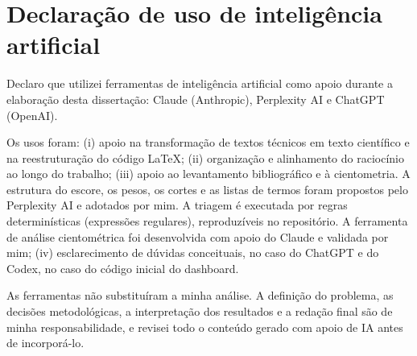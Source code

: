 
\chapter*{Declaração de uso de inteligência artificial}


Declaro que utilizei ferramentas de inteligência artificial como apoio durante a elaboração desta dissertação: Claude (Anthropic), Perplexity AI e ChatGPT (OpenAI).

Os usos foram: (i) apoio na transformação de textos técnicos em texto científico e na reestruturação do código LaTeX; (ii) organização e alinhamento do raciocínio ao longo do trabalho; (iii) apoio ao levantamento bibliográfico e à cientometria. A estrutura do escore, os pesos, os cortes e as listas de termos foram propostos pelo Perplexity AI e adotados por mim. A triagem é executada por regras determinísticas (expressões regulares), reproduzíveis no repositório. A ferramenta de análise cientométrica foi desenvolvida com apoio do Claude e validada por mim; (iv) esclarecimento de dúvidas conceituais, no caso do ChatGPT e do Codex, no caso do código inicial do dashboard.

As ferramentas não substituíram a minha análise. A definição do problema, as decisões metodológicas, a interpretação dos resultados e a redação final são de minha responsabilidade, e revisei todo o conteúdo gerado com apoio de IA antes de incorporá-lo.
